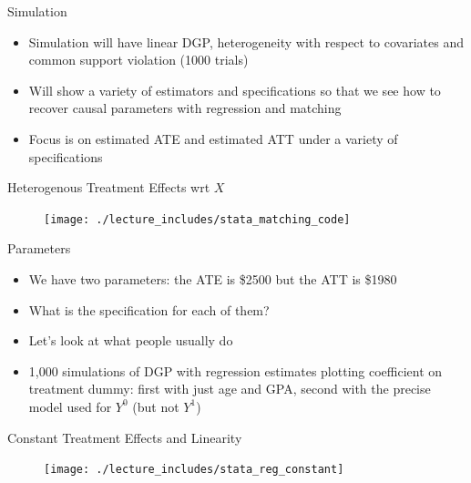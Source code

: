 \documentclass{beamer}
\begin{document}
\begin{frame}{Simulation}

\begin{itemize}

\item Simulation will have linear DGP, heterogeneity with respect to covariates and common support violation (1000 trials)
\item Will show a variety of estimators and specifications so that we see how to recover causal parameters with regression and matching
\item Focus is on estimated ATE and estimated ATT under a variety of specifications
\end{itemize}

\end{frame}

\begin{frame}{Heterogenous Treatment Effects wrt $X$}

\begin{figure}[!t]\centering
\texttt{[image: ./lecture\_includes/stata\_matching\_code]}
\end{figure}

\end{frame}

\begin{frame}{Parameters}

\begin{itemize}

\item We have two parameters: the ATE is \$2500 but the ATT is \$1980
\item What is the specification for each of them?
\item Let's look at what people usually do
\item 1,000 simulations of DGP with regression estimates plotting coefficient on treatment dummy: first with just age and GPA, second with the precise model used for $Y^0$ (but not $Y^1$)

\end{itemize}

\end{frame}


\begin{frame}{Constant Treatment Effects and Linearity}

\begin{figure}[!t]\centering
\texttt{[image: ./lecture\_includes/stata\_reg\_constant]}
\end{figure}

\end{frame}
\end{document}
